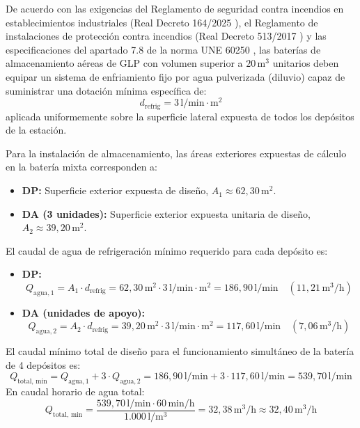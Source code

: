 \documentclass[12pt]{article}
\begin{document}
        De acuerdo con las exigencias del Reglamento de seguridad contra incendios en establecimientos industriales (Real Decreto 164/2025 \cite{rd164}), el Reglamento de instalaciones de protección contra incendios (Real Decreto 513/2017 \cite{rd513}) y las especificaciones del apartado 7.8 de la norma UNE 60250 \cite{une60250}, las baterías de almacenamiento aéreas de GLP con volumen superior a $20\,\text{m}^3$ unitarios deben equipar un sistema de enfriamiento fijo por agua pulverizada (diluvio) capaz de suministrar una dotación mínima específica de:
        \begin{equation}
            d_{\text{refrig}} = 3\,\text{l}/\text{min}\cdot\text{m}^2
        \end{equation}
        aplicada uniformemente sobre la superficie lateral expuesta de todos los depósitos de la estación.

        Para la instalación de almacenamiento, las áreas exteriores expuestas de cálculo en la batería mixta corresponden a:
        \begin{itemize}
            \item \textbf{DP:} Superficie exterior expuesta de diseño, $A_1 \approx 62,30\,\text{m}^2$.
            \item \textbf{DA (3 unidades):} Superficie exterior expuesta unitaria de diseño, $A_2 \approx 39,20\,\text{m}^2$.
        \end{itemize}

        El caudal de agua de refrigeración mínimo requerido para cada depósito es:
        \begin{itemize}
            \item \textbf{DP:}
            \begin{equation}
                Q_{\text{agua}, 1} = A_1 \cdot d_{\text{refrig}} = 62,30\,\text{m}^2 \cdot 3\,\text{l}/\text{min}\cdot\text{m}^2 = 186,90\,\text{l}/\text{min} \quad (11,21\,\text{m}^3/\text{h})
            \end{equation}
            \item \textbf{DA (unidades de apoyo):}
            \begin{equation}
                Q_{\text{agua}, 2} = A_2 \cdot d_{\text{refrig}} = 39,20\,\text{m}^2 \cdot 3\,\text{l}/\text{min}\cdot\text{m}^2 = 117,60\,\text{l}/\text{min} \quad (7,06\,\text{m}^3/\text{h})
            \end{equation}
        \end{itemize}

        El caudal mínimo total de diseño para el funcionamiento simultáneo de la batería de 4 depósitos es:
        \begin{equation}
            Q_{\text{total, min}} = Q_{\text{agua}, 1} + 3 \cdot Q_{\text{agua}, 2} = 186,90\,\text{l}/\text{min} + 3 \cdot 117,60\,\text{l}/\text{min} = 539,70\,\text{l}/\text{min}
        \end{equation}
        En caudal horario de agua total:
        \begin{equation}
            Q_{\text{total, min}} = \frac{539,70\,\text{l}/\text{min} \cdot 60\,\text{min}/\text{h}}{1.000\,\text{l}/\text{m}^3} = 32,38\,\text{m}^3/\text{h} \approx 32,40\,\text{m}^3/\text{h}
        \end{equation}
\end{document}
